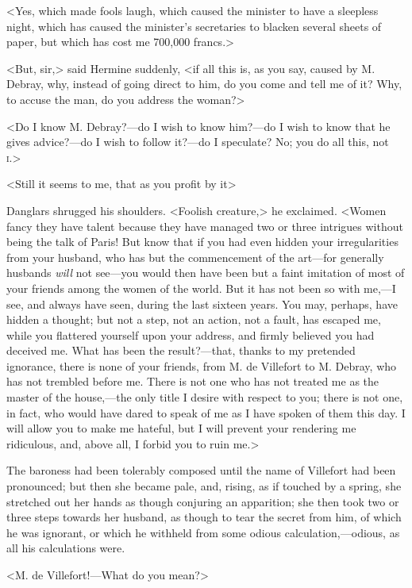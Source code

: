  <Yes, which made fools laugh, which caused the minister to have a sleepless night, which has caused the minister's secretaries to blacken several sheets of paper, but which has cost me 700,000 francs.> 

 <But, sir,> said Hermine suddenly, <if all this is, as you say, caused by M. Debray, why, instead of going direct to him, do you come and tell me of it? Why, to accuse the man, do you address the woman?> 

 <Do I know M. Debray?—do I wish to know him?—do I wish to know that he gives advice?—do I wish to follow it?—do I speculate? No; you do all this, not \textsc{i.}> 

 <Still it seems to me, that as you profit by it\longdash> 

 Danglars shrugged his shoulders. <Foolish creature,> he exclaimed. <Women fancy they have talent because they have managed two or three intrigues without being the talk of Paris! But know that if you had even hidden your irregularities from your husband, who has but the commencement of the art—for generally husbands \textit{will} not see—you would then have been but a faint imitation of most of your friends among the women of the world. But it has not been so with me,—I see, and always have seen, during the last sixteen years. You may, perhaps, have hidden a thought; but not a step, not an action, not a fault, has escaped me, while you flattered yourself upon your address, and firmly believed you had deceived me. What has been the result?—that, thanks to my pretended ignorance, there is none of your friends, from M. de Villefort to M. Debray, who has not trembled before me. There is not one who has not treated me as the master of the house,—the only title I desire with respect to you; there is not one, in fact, who would have dared to speak of me as I have spoken of them this day. I will allow you to make me hateful, but I will prevent your rendering me ridiculous, and, above all, I forbid you to ruin me.> 

 The baroness had been tolerably composed until the name of Villefort had been pronounced; but then she became pale, and, rising, as if touched by a spring, she stretched out her hands as though conjuring an apparition; she then took two or three steps towards her husband, as though to tear the secret from him, of which he was ignorant, or which he withheld from some odious calculation,—odious, as all his calculations were. 

 <M. de Villefort!—What do you mean?> 

